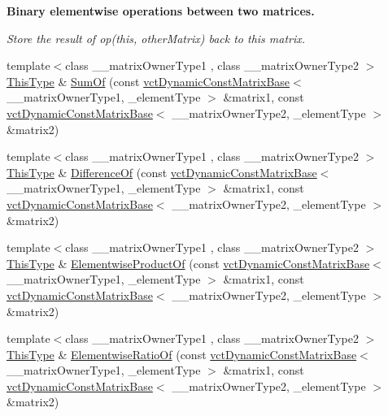 \begin{Indent}{\bf Binary elementwise operations between two matrices.}\par
{\em Store the result of op(this, other\-Matrix) back to this matrix. }\begin{DoxyCompactItemize}
\item 
{\footnotesize template$<$class \-\_\-\-\_\-matrix\-Owner\-Type1 , class \-\_\-\-\_\-matrix\-Owner\-Type2 $>$ }\\\hyperlink{classvct_dynamic_const_matrix_base_ac4ff48cbe4d9de3fdef5a02447ffb9db}{This\-Type} \& \hyperlink{classvct_dynamic_matrix_base_a766669667dc485fc1692d7acaa5e6111}{Sum\-Of} (const \hyperlink{classvct_dynamic_const_matrix_base}{vct\-Dynamic\-Const\-Matrix\-Base}$<$ \-\_\-\-\_\-matrix\-Owner\-Type1, \-\_\-element\-Type $>$ \&matrix1, const \hyperlink{classvct_dynamic_const_matrix_base}{vct\-Dynamic\-Const\-Matrix\-Base}$<$ \-\_\-\-\_\-matrix\-Owner\-Type2, \-\_\-element\-Type $>$ \&matrix2)
\item 
{\footnotesize template$<$class \-\_\-\-\_\-matrix\-Owner\-Type1 , class \-\_\-\-\_\-matrix\-Owner\-Type2 $>$ }\\\hyperlink{classvct_dynamic_const_matrix_base_ac4ff48cbe4d9de3fdef5a02447ffb9db}{This\-Type} \& \hyperlink{classvct_dynamic_matrix_base_afc79dd9a0bf3514f5b0abd2fee2011a1}{Difference\-Of} (const \hyperlink{classvct_dynamic_const_matrix_base}{vct\-Dynamic\-Const\-Matrix\-Base}$<$ \-\_\-\-\_\-matrix\-Owner\-Type1, \-\_\-element\-Type $>$ \&matrix1, const \hyperlink{classvct_dynamic_const_matrix_base}{vct\-Dynamic\-Const\-Matrix\-Base}$<$ \-\_\-\-\_\-matrix\-Owner\-Type2, \-\_\-element\-Type $>$ \&matrix2)
\item 
{\footnotesize template$<$class \-\_\-\-\_\-matrix\-Owner\-Type1 , class \-\_\-\-\_\-matrix\-Owner\-Type2 $>$ }\\\hyperlink{classvct_dynamic_const_matrix_base_ac4ff48cbe4d9de3fdef5a02447ffb9db}{This\-Type} \& \hyperlink{classvct_dynamic_matrix_base_a45e0a6a1edf0bf79a772341ca21638a1}{Elementwise\-Product\-Of} (const \hyperlink{classvct_dynamic_const_matrix_base}{vct\-Dynamic\-Const\-Matrix\-Base}$<$ \-\_\-\-\_\-matrix\-Owner\-Type1, \-\_\-element\-Type $>$ \&matrix1, const \hyperlink{classvct_dynamic_const_matrix_base}{vct\-Dynamic\-Const\-Matrix\-Base}$<$ \-\_\-\-\_\-matrix\-Owner\-Type2, \-\_\-element\-Type $>$ \&matrix2)
\item 
{\footnotesize template$<$class \-\_\-\-\_\-matrix\-Owner\-Type1 , class \-\_\-\-\_\-matrix\-Owner\-Type2 $>$ }\\\hyperlink{classvct_dynamic_const_matrix_base_ac4ff48cbe4d9de3fdef5a02447ffb9db}{This\-Type} \& \hyperlink{classvct_dynamic_matrix_base_a8f5bee5a4a265e230ef7b050d0513e67}{Elementwise\-Ratio\-Of} (const \hyperlink{classvct_dynamic_const_matrix_base}{vct\-Dynamic\-Const\-Matrix\-Base}$<$ \-\_\-\-\_\-matrix\-Owner\-Type1, \-\_\-element\-Type $>$ \&matrix1, const \hyperlink{classvct_dynamic_const_matrix_base}{vct\-Dynamic\-Const\-Matrix\-Base}$<$ \-\_\-\-\_\-matrix\-Owner\-Type2, \-\_\-element\-Type $>$ \&matrix2)

\end{DoxyCompactItemize}
\end{Indent}
